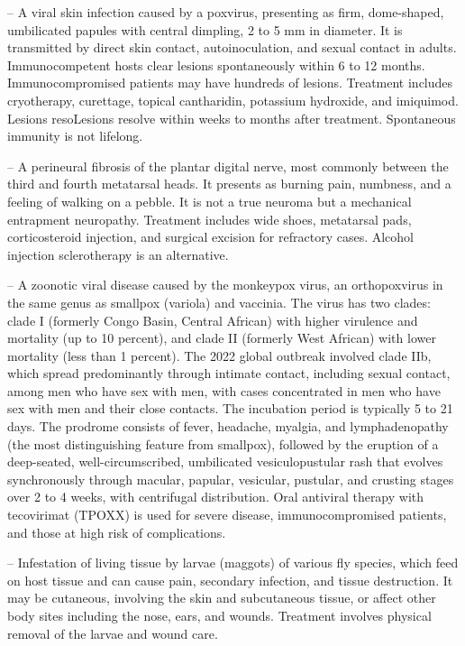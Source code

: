 -- A viral skin infection caused by a poxvirus, presenting as firm, dome-shaped, umbilicated papules with central dimpling, 2 to 5 mm in diameter. It is transmitted by direct skin contact, autoinoculation, and sexual contact in adults. Immunocompetent hosts clear lesions spontaneously within 6 to 12 months. Immunocompromised patients may have hundreds of lesions. Treatment includes cryotherapy, curettage, topical cantharidin, potassium hydroxide, and imiquimod. Lesions resoLesions resolve within weeks to months after treatment. Spontaneous immunity is not lifelong.

-- A perineural fibrosis of the plantar digital nerve, most commonly between the third and fourth metatarsal heads. It presents as burning pain, numbness, and a feeling of walking on a pebble. It is not a true neuroma but a mechanical entrapment neuropathy. Treatment includes wide shoes, metatarsal pads, corticosteroid injection, and surgical excision for refractory cases. Alcohol injection sclerotherapy is an alternative.

-- A zoonotic viral disease caused by the monkeypox virus, an orthopoxvirus in the same genus as smallpox (variola) and vaccinia. The virus has two clades: clade I (formerly Congo Basin, Central African) with higher virulence and mortality (up to 10 percent), and clade II (formerly West African) with lower mortality (less than 1 percent). The 2022 global outbreak involved clade IIb, which spread predominantly through intimate contact, including sexual contact, among men who have sex with men, with cases concentrated in men who have sex with men and their close contacts. The incubation period is typically 5 to 21 days. The prodrome consists of fever, headache, myalgia, and lymphadenopathy (the most distinguishing feature from smallpox), followed by the eruption of a deep-seated, well-circumscribed, umbilicated vesiculopustular rash that evolves synchronously through macular, papular, vesicular, pustular, and crusting stages over 2 to 4 weeks, with centrifugal distribution. Oral antiviral therapy with tecovirimat (TPOXX) is used for severe disease, immunocompromised patients, and those at high risk of complications.

-- Infestation of living tissue by larvae (maggots) of various fly species, which feed on host tissue and can cause pain, secondary infection, and tissue destruction. It may be cutaneous, involving the skin and subcutaneous tissue, or affect other body sites including the nose, ears, and wounds. Treatment involves physical removal of the larvae and wound care.

